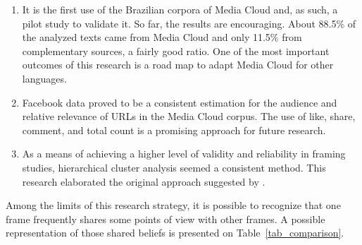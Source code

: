 \begin{enumerate}
\item It is the first use of the Brazilian corpora of Media Cloud and, as such, a pilot study to validate it. So far, the results are encouraging. 
About 88.5\% of the analyzed texts came from Media Cloud and only 11.5\% from complementary sources, a fairly good ratio. One of the most important outcomes of this research is a road map to adapt Media Cloud for other languages.
\item Facebook data proved to be a consistent estimation for the audience and relative relevance of URLs in the Media Cloud corpus. The use of like, share, comment, and total count is a promising approach for future research.
\item As a means of achieving a higher level of validity and reliability in framing studies, hierarchical cluster analysis seemed a consistent method. This research elaborated the original approach suggested by \citeauthor{matthes2008content} \autocite{matthes2008content}.
\end{enumerate}

Among the limits of this research strategy, it is possible to recognize that one frame frequently shares some points of view with other frames. A possible representation of those shared beliefs is presented on Table~\ref{tab_comparison}.

